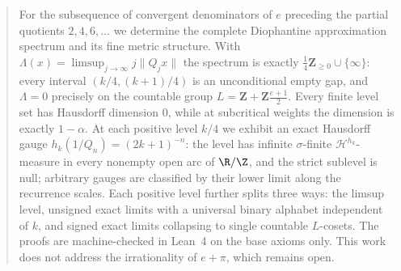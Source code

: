 
\maketitle

\begin{abstract}
For the subsequence of convergent denominators of $e$ preceding the partial
quotients $2,4,6,\dots$ we determine the complete Diophantine approximation
spectrum and its fine metric structure. With
$\Lambda(x)=\limsup_{j\to\infty} j\|Q_jx\|$ the spectrum is exactly
$\frac14\mathbf{Z}_{\ge0}\cup\{\infty\}$: every interval $(k/4,(k+1)/4)$ is
an unconditional empty gap, and $\Lambda=0$ precisely on the countable group
$L=\mathbf{Z}+\mathbf{Z}\frac{e+1}{2}$. Every finite level set has Hausdorff
dimension $0$, while at subcritical weights the dimension is exactly
$1-\alpha$. At each positive level $k/4$ we exhibit an exact Hausdorff gauge
$h_k(1/Q_n)=(2k+1)^{-n}$: the level has infinite $\sigma$-finite
$\mathcal{H}^{h_k}$-measure in every nonempty open arc of $\R/\Z$, and the
strict sublevel is null; arbitrary gauges are classified by their lower limit
along the recurrence scales. Each positive level further splits three ways:
the limsup level, unsigned exact limits with a universal binary alphabet
independent of $k$, and signed exact limits collapsing to single countable
$L$-cosets. The proofs are machine-checked in Lean~4 on the base axioms only.
This work does not address the irrationality of $e+\pi$, which remains open.
\end{abstract}
